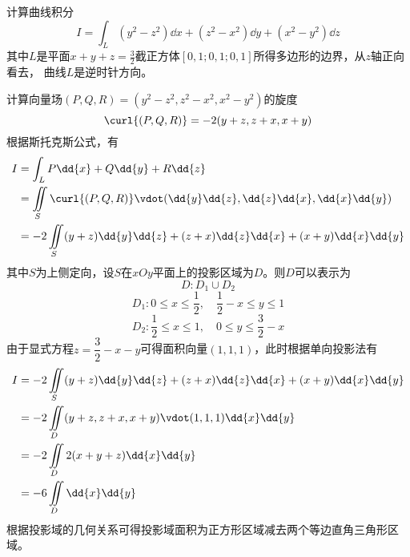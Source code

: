 \begin{example}
    计算曲线积分
    \[ I = \int_L (y^2-z^2)\dd{x} + (z^2-x^2)\dd{y} + (x^2-y^2)\dd{z} \]
    其中$L$是平面$x+y+z=\frac{3}{2}$截正方体$[0,1;0,1;0,1]$所得多边形的边界，从$z$轴正向看去，
    曲线$L$是逆时针方向。
\end{example}
\begin{solution}
    计算向量场$(P,Q,R)=(y^2-z^2, z^2-x^2, x^2-y^2)$的旋度
    \[ \curl{(P,Q,R)} = -2(y+z, z+x, x+y) \]
    根据斯托克斯公式，有
    \begin{align*}
        I & = \int_L P\dd{x} + Q\dd{y} + R\dd{z}                                         \\
          & = \iint\limits_S \curl{(P,Q,R)}\vdot(\dd{y}\dd{z},\dd{z}\dd{x},\dd{x}\dd{y}) \\
          & = -2\iint\limits_S (y+z)\dd{y}\dd{z} + (z+x)\dd{z}\dd{x} + (x+y)\dd{x}\dd{y}
    \end{align*}
    其中$S$为上侧定向，设$S$在$xOy$平面上的投影区域为$D$。则$D$可以表示为
    \[ D: D_1 \cup D_2 \]
    \[ D_1 : 0\leq x\leq \frac{1}{2},\quad \frac{1}{2} - x \leq y \leq 1  \]
    \[ D_2 : \frac{1}{2}\leq x\leq 1,\quad 0 \leq y \leq \frac{3}{2} - x  \]
    由于显式方程$z=\dfrac{3}{2}-x-y$可得面积向量$(1,1,1)$，此时根据单向投影法有
    \begin{align*}
        I & = -2\iint\limits_S (y+z)\dd{y}\dd{z} + (z+x)\dd{z}\dd{x} + (x+y)\dd{x}\dd{y} \\
          & =-2\iint\limits_D (y+z,z+x,x+y)\vdot(1,1,1)\dd{x}\dd{y}                      \\
          & =-2\iint\limits_D 2(x+y+z)\dd{x}\dd{y}                                       \\
          & =-6\iint\limits_D\dd{x}\dd{y}
    \end{align*}
    根据投影域的几何关系可得投影域面积为正方形区域减去两个等边直角三角形区域。
    \begin{figure}[H]
        \centering
\end{figure}
\end{solution}
